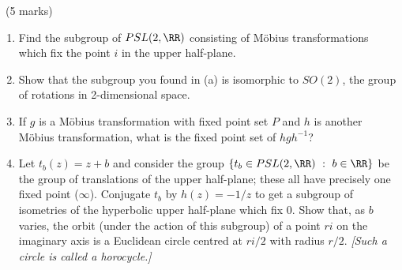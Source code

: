 \documentclass[12pt]{article}
\begin{document}
\begin{question}\ (5 marks)\\

  \begin{enumerate}
  \item[(a)] Find the subgroup of $PSL(2,\RR)$ consisting of M\"obius transformations which fix the point $i$ in the upper half-plane.
  \item[(b)] Show that the subgroup you found in (a) is isomorphic to $SO(2)$, the group of rotations in 2-dimensional space.
  \item[(c)] If $g$ is a M\"obius transformation with fixed point set $P$ and $h$ is another M\"obius transformation, what is the fixed point set of $hgh^{-1}$?
  \item[(d)] Let $t_b(z)=z+b$ and consider the group $\{t_b\in PSL(2,\RR)\ :\ b\in\RR\}$ be the group of translations of the upper half-plane; these all have precisely one fixed point ($\infty$). Conjugate $t_b$ by $h(z)=-1/z$ to get a subgroup of isometries of the hyperbolic upper half-plane which fix $0$. Show that, as $b$ varies, the orbit (under the action of this subgroup) of a point $ri$ on the imaginary axis is a Euclidean circle centred at $ri/2$ with radius $r/2$. {\em [Such a circle is called a horocycle.]}
  \end{enumerate}
\end{question}
\iffalse
\end{document}
